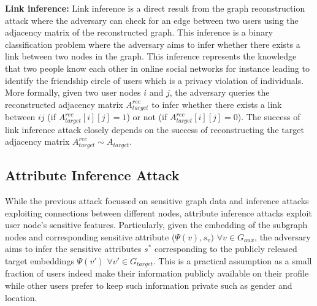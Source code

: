 \noindent\textbf{Link inference:}
Link inference is a direct result from the graph reconstruction attack where the adversary can check for an edge between two users using the adjacency matrix of the reconstructed graph.
This inference is a binary classification problem where the adversary aims to infer whether there exists a link between two nodes in the graph.
This inference represents the knowledge that two people know each other in online social networks for instance leading to identify the friendship circle of users which is a privacy violation of individuals.
More formally, given two user nodes $i$ and $j$, the adversary queries the reconstructed adjacency matrix $A_{target}^{rec}$ to infer whether there exists a link between $ij$ (if $A_{target}^{rec}[i][j] = 1$) or not (if $A_{target}^{rec}[i][j] = 0$).
The success of link inference attack closely depends on the success of reconstructing the target adjacency matrix $A_{target}^{rec} \sim A_{target}$.





\subsection{Attribute Inference Attack}

While the previous attack focussed on sensitive graph data and inference attacks exploiting connections between different nodes, attribute inference attacks exploit user node's sensitive features.
Particularly, given the embedding of the subgraph nodes and corresponding sensitive attribute ($\Psi (v), s_{v})$ $\forall v \in G_{aux}$, the adversary aims to infer the sensitive attributes $s^*$ corresponding to the publicly released target embeddings $\Psi (v')$ $\forall v' \in G_{target}$.
This is a practical assumption as a small fraction of users indeed make their information publicly available on their profile while other users prefer to keep such information private such as gender and location.


